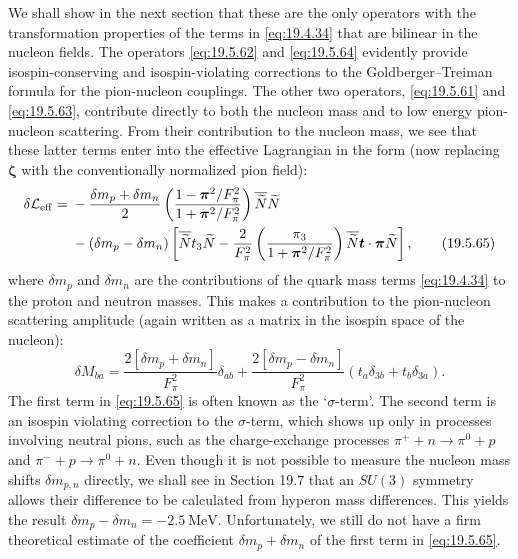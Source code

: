 We shall show in the next section that these are the only operators with the transformation properties of the terms in \eqref{eq:19.4.34} that are bilinear in the nucleon fields. The operators \eqref{eq:19.5.62} and \eqref{eq:19.5.64} evidently provide isospin-conserving and isospin-violating corrections to the Goldberger--Treiman formula for the pion-nucleon couplings. The other two operators, \eqref{eq:19.5.61} and \eqref{eq:19.5.63}, contribute directly to both the nucleon mass and to low energy pion-nucleon scattering. From their contribution to the nucleon mass, we see that these latter terms enter into the effective Lagrangian in the form (now replacing $\boldsymbol{\zeta}$ with the conventionally normalized pion field):
\begin{align}
\delta\mathcal L_{\mathrm{eff}}
={}&-\frac{\delta m_p+\delta m_n}{2}
\left(\frac{1-\boldsymbol{\pi}^2/F_\pi^2}
{1+\boldsymbol{\pi}^2/F_\pi^2}\right)
\overline{\widetilde N}\widetilde N
\notag\\
&-(\delta m_p-\delta m_n)
\left[
\overline{\widetilde N}t_3\widetilde N
-\frac{2}{F_\pi^2}
\left(\frac{\pi_3}{1+\boldsymbol{\pi}^2/F_\pi^2}\right)
\overline{\widetilde N}\boldsymbol t\cdot
\boldsymbol{\pi}\widetilde N
\right],
\tag{19.5.65}\label{eq:19.5.65}
\end{align}
where $\delta m_p$ and $\delta m_n$ are the contributions of the quark mass terms \eqref{eq:19.4.34} to the proton and neutron masses. This makes a contribution to the pion-nucleon scattering amplitude (again written as a matrix in the isospin space of the nucleon):
\begin{equation}
\delta M_{ba}
=\frac{2[\delta m_p+\delta m_n]}{F_\pi^2}\delta_{ab}
+\frac{2[\delta m_p-\delta m_n]}{F_\pi^2}
(t_a\delta_{3b}+t_b\delta_{3a}).
\tag{19.5.66}\label{eq:19.5.66}
\end{equation}
The first term in \eqref{eq:19.5.65} is often known as the `$\sigma$-term'. The second term is an isospin violating correction to the $\sigma$-term, which shows up only in processes involving neutral pions, such as the charge-exchange processes $\pi^++n\to\pi^0+p$ and $\pi^-+p\to\pi^0+n$. Even though it is not possible to measure the nucleon mass shifts $\delta m_{p,n}$ directly, we shall see in Section 19.7 that an $SU(3)$ symmetry allows their difference to be calculated from hyperon mass differences. This yields the result $\delta m_p-\delta m_n=-2.5\ \mathrm{MeV}$. Unfortunately, we still do not have a firm theoretical estimate of the coefficient $\delta m_p+\delta m_n$ of the first term in \eqref{eq:19.5.65}.

